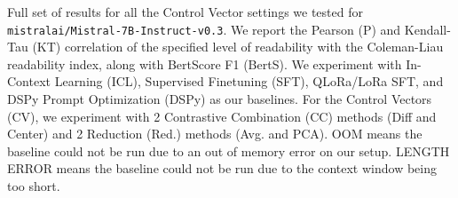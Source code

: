 \begin{table}[!ht]
\caption[Full set of results for all the Control Vector settings we tested for \texttt{mistralai/Mistral-7B-Instruct-v0.3}.]{Full set of results for all the Control Vector settings we tested for \texttt{mistralai/Mistral-7B-Instruct-v0.3}. We report the Pearson (P) and Kendall-Tau (KT) correlation of the specified level of readability with the Coleman-Liau readability index, along with BertScore F1 (BertS). We experiment with In-Context Learning (ICL), Supervised Finetuning (SFT), QLoRa/LoRa SFT, and DSPy Prompt Optimization (DSPy) as our baselines. For the Control Vectors (CV), we experiment with 2 Contrastive Combination (CC) methods (Diff and Center) and 2 Reduction (Red.) methods (Avg. and PCA). OOM means the baseline could not be run due to an out of memory error on our setup. LENGTH ERROR means the baseline could not be run due to the context window being too short.}
\label{tab:main-results-mistral}
\end{table}